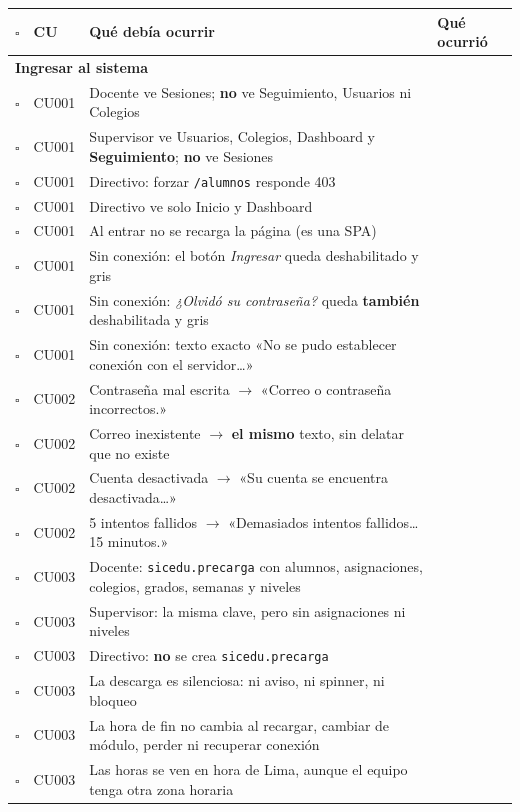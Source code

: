 \documentclass[11pt,a4paper]{article}
\newcommand{\ruta}[1]{\textcolor{azulmarino}{\texttt{#1}}}
\newcommand{\ok}{$\square$}
\newcommand{\flecha}{$\rightarrow$}
\begin{document}
\begin{longtable}{|c|p{1.9cm}|p{6.1cm}|p{4.3cm}|}
\hline
\textbf{\ok} & \textbf{CU} & \textbf{Qué debía ocurrir} & \textbf{Qué ocurrió} \\
\hline
\endhead
\multicolumn{4}{|l|}{\cellcolor{grisclaro}\textbf{Ingresar al sistema}} \\ \hline
\ok & CU001 & Docente ve Sesiones; \textbf{no} ve Seguimiento, Usuarios ni Colegios & \\[0.5cm] \hline
\ok & CU001 & Supervisor ve Usuarios, Colegios, Dashboard y \textbf{Seguimiento}; \textbf{no} ve Sesiones & \\[0.5cm] \hline
\ok & CU001 & Directivo: forzar \ruta{/alumnos} responde 403 & \\[0.5cm] \hline
\ok & CU001 & Directivo ve solo Inicio y Dashboard & \\[0.5cm] \hline
\ok & CU001 & Al entrar no se recarga la página (es una SPA) & \\[0.5cm] \hline
\ok & CU001 & Sin conexión: el botón \emph{Ingresar} queda deshabilitado y gris & \\[0.5cm] \hline
\ok & CU001 & Sin conexión: \emph{¿Olvidó su contraseña?} queda \textbf{también} deshabilitada y gris & \\[0.5cm] \hline
\ok & CU001 & Sin conexión: texto exacto «No se pudo establecer conexión con el servidor\ldots» & \\[0.5cm] \hline
\ok & CU002 & Contraseña mal escrita \flecha{} «Correo o contraseña incorrectos.» & \\[0.5cm] \hline
\ok & CU002 & Correo inexistente \flecha{} \textbf{el mismo} texto, sin delatar que no existe & \\[0.5cm] \hline
\ok & CU002 & Cuenta desactivada \flecha{} «Su cuenta se encuentra desactivada\ldots» & \\[0.5cm] \hline
\ok & CU002 & 5 intentos fallidos \flecha{} «Demasiados intentos fallidos\ldots 15 minutos.» & \\[0.5cm] \hline
\ok & CU003 & Docente: \texttt{sicedu.precarga} con alumnos, asignaciones, colegios, grados, semanas y niveles & \\[0.5cm] \hline
\ok & CU003 & Supervisor: la misma clave, pero sin asignaciones ni niveles & \\[0.5cm] \hline
\ok & CU003 & Directivo: \textbf{no} se crea \texttt{sicedu.precarga} & \\[0.5cm] \hline
\ok & CU003 & La descarga es silenciosa: ni aviso, ni spinner, ni bloqueo & \\[0.5cm] \hline
\ok & CU003 & La hora de fin no cambia al recargar, cambiar de módulo, perder ni recuperar conexión & \\[0.5cm] \hline
\ok & CU003 & Las horas se ven en hora de Lima, aunque el equipo tenga otra zona horaria & \\[0.5cm] \hline


\end{longtable}
\end{document}
